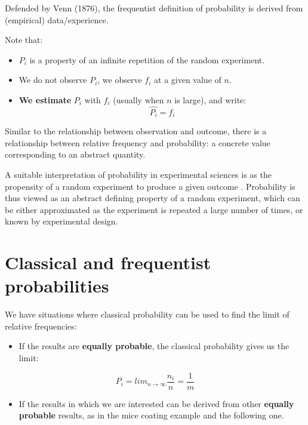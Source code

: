 \documentclass[
]{book}
\providecommand{\tightlist}{%
  \setlength{\itemsep}{0pt}\setlength{\parskip}{0pt}}
\begin{document}
Defended by Venn (1876), the frequentist definition of probability is derived from (empirical) data/experience.

Note that:

\begin{itemize}
\tightlist
\item
  \(P_i\) is a property of an infinite repetition of the random experiment.
\item
  We do not observe \(P_i\), we observe \(f_i\) at a given value of \(n\).
\item
  \textbf{We estimate} \(P_i\) with \(f_i\) (usually when \(n\) is large), and write: \[\hat {P_ i}= f_i\]
\end{itemize}

Similar to the relationship between observation and outcome, there is a relationship between relative frequency and probability: a concrete value corresponding to an abstract quantity.

A suitable interpretation of probability in experimental sciences is as the propensity of a random experiment to produce a given outcome \citep{popper2002logic}. Probability is thus viewed as an abstract defining property of a random experiment, which can be either approximated as the experiment is repeated a large number of times, or known by experimental design.

\hypertarget{classical-and-frequentist-probabilities}{%
\section{Classical and frequentist probabilities}\label{classical-and-frequentist-probabilities}}

We have situations where classical probability can be used to find the limit of relative frequencies:

\begin{itemize}
\tightlist
\item
  If the results are \textbf{equally probable}, the classical probability gives us the limit:
\end{itemize}

\[P_i=lim_{n\rightarrow \infty} \frac{n_i}{n}=\frac{1}{m}\]

\begin{itemize}
\tightlist
\item
  If the results in which we are interested can be derived from other \textbf{equally probable} results, as in the mice coating example and the following one.
\end{itemize}
\end{document}
